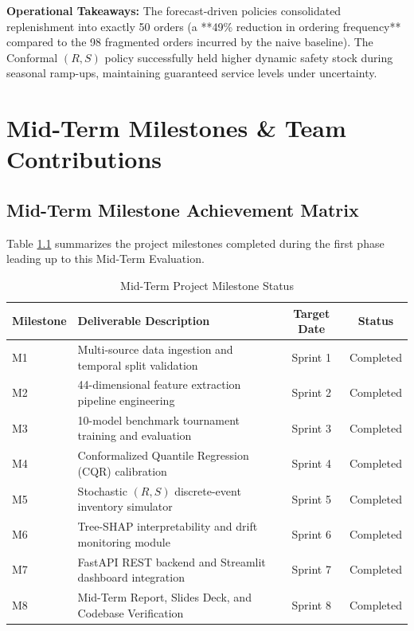 \documentclass[12pt,a4paper,oneside]{report}
\theoremstyle{definition}
\begin{document}
\noindent \textbf{Operational Takeaways:} The forecast-driven policies consolidated replenishment into exactly 50 orders (a **49\% reduction in ordering frequency** compared to the 98 fragmented orders incurred by the naive baseline). The Conformal $(R, S)$ policy successfully held higher dynamic safety stock during seasonal ramp-ups, maintaining guaranteed service levels under uncertainty.

\newpage
\chapter{Mid-Term Milestones \& Team Contributions}

\section{Mid-Term Milestone Achievement Matrix}
Table \ref{tab:milestones} summarizes the project milestones completed during the first phase leading up to this Mid-Term Evaluation.

\begin{table}[H]
\centering
\caption{Mid-Term Project Milestone Status}
\label{tab:milestones}
\begin{tabularx}{\textwidth}{llcc}
\toprule
\textbf{Milestone} & \textbf{Deliverable Description} & \textbf{Target Date} & \textbf{Status} \\
\midrule
M1 & Multi-source data ingestion and temporal split validation & Sprint 1 & Completed \\
M2 & 44-dimensional feature extraction pipeline engineering & Sprint 2 & Completed \\
M3 & 10-model benchmark tournament training and evaluation & Sprint 3 & Completed \\
M4 & Conformalized Quantile Regression (CQR) calibration & Sprint 4 & Completed \\
M5 & Stochastic $(R, S)$ discrete-event inventory simulator & Sprint 5 & Completed \\
M6 & Tree-SHAP interpretability and drift monitoring module & Sprint 6 & Completed \\
M7 & FastAPI REST backend and Streamlit dashboard integration & Sprint 7 & Completed \\
M8 & Mid-Term Report, Slides Deck, and Codebase Verification & Sprint 8 & Completed \\
\bottomrule
\end{tabularx}
\end{table}
\end{document}
